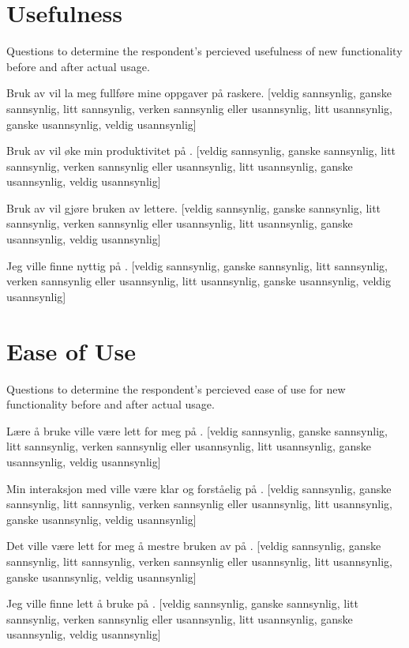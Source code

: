 \section{Usefulness}

Questions to determine the respondent's percieved usefulness of new
functionality before and after actual usage.

\begin{items}
  \item Bruk av \siste{} vil la meg fullføre mine oppgaver på \urort{}
    raskere.
    [veldig sannsynlig, ganske sannsynlig, litt sannsynlig,
    verken sannsynlig eller usannsynlig,
    litt usannsynlig, ganske usannsynlig, veldig usannsynlig]
  \item Bruk av \siste{} vil øke min produktivitet på \urort{}.
    [veldig sannsynlig, ganske sannsynlig, litt sannsynlig,
    verken sannsynlig eller usannsynlig,
    litt usannsynlig, ganske usannsynlig, veldig usannsynlig]
  \item Bruk av \siste{} vil gjøre bruken av \urort{} lettere.
    [veldig sannsynlig, ganske sannsynlig, litt sannsynlig,
    verken sannsynlig eller usannsynlig,
    litt usannsynlig, ganske usannsynlig, veldig usannsynlig]
  \item Jeg ville finne \siste{} nyttig på \urort{}.
    [veldig sannsynlig, ganske sannsynlig, litt sannsynlig,
    verken sannsynlig eller usannsynlig,
    litt usannsynlig, ganske usannsynlig, veldig usannsynlig]
\end{items}

\section{Ease of Use}

Questions to determine the respondent's percieved ease of use for new
functionality before and after actual usage.

\begin{items}
  \item Lære å bruke \siste{} ville være lett for meg på \urort{}.
    [veldig sannsynlig, ganske sannsynlig, litt sannsynlig,
    verken sannsynlig eller usannsynlig,
    litt usannsynlig, ganske usannsynlig, veldig usannsynlig]
  \item Min interaksjon med \siste{} ville være klar og forståelig
    på \urort{}.
    [veldig sannsynlig, ganske sannsynlig, litt sannsynlig,
    verken sannsynlig eller usannsynlig,
    litt usannsynlig, ganske usannsynlig, veldig usannsynlig]
  \item Det ville være lett for meg å mestre bruken av \siste{}
    på \urort{}.
    [veldig sannsynlig, ganske sannsynlig, litt sannsynlig,
    verken sannsynlig eller usannsynlig,
    litt usannsynlig, ganske usannsynlig, veldig usannsynlig]
  \item Jeg ville finne \siste{} lett å bruke på \urort{}.
    [veldig sannsynlig, ganske sannsynlig, litt sannsynlig,
    verken sannsynlig eller usannsynlig,
    litt usannsynlig, ganske usannsynlig, veldig usannsynlig]
\end{items}

